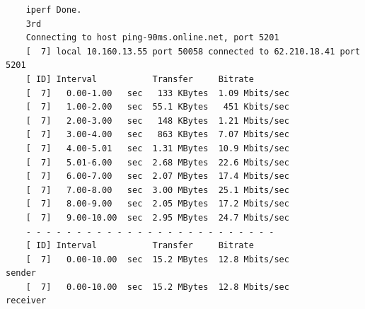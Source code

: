 \documentclass[paper=a4, fontsize=10pt]{scrartcl} %
\numberwithin{equation}{section} %
\numberwithin{figure}{section} %
\numberwithin{table}{section} %
\begin{document}
\begin{lstlisting}
    iperf Done.
    3rd
    Connecting to host ping-90ms.online.net, port 5201
    [  7] local 10.160.13.55 port 50058 connected to 62.210.18.41 port 5201
    [ ID] Interval           Transfer     Bitrate
    [  7]   0.00-1.00   sec   133 KBytes  1.09 Mbits/sec                  
    [  7]   1.00-2.00   sec  55.1 KBytes   451 Kbits/sec                  
    [  7]   2.00-3.00   sec   148 KBytes  1.21 Mbits/sec                  
    [  7]   3.00-4.00   sec   863 KBytes  7.07 Mbits/sec                  
    [  7]   4.00-5.01   sec  1.31 MBytes  10.9 Mbits/sec                  
    [  7]   5.01-6.00   sec  2.68 MBytes  22.6 Mbits/sec                  
    [  7]   6.00-7.00   sec  2.07 MBytes  17.4 Mbits/sec                  
    [  7]   7.00-8.00   sec  3.00 MBytes  25.1 Mbits/sec                  
    [  7]   8.00-9.00   sec  2.05 MBytes  17.2 Mbits/sec                  
    [  7]   9.00-10.00  sec  2.95 MBytes  24.7 Mbits/sec                  
    - - - - - - - - - - - - - - - - - - - - - - - - -
    [ ID] Interval           Transfer     Bitrate
    [  7]   0.00-10.00  sec  15.2 MBytes  12.8 Mbits/sec                  sender
    [  7]   0.00-10.00  sec  15.2 MBytes  12.8 Mbits/sec                  receiver
    

\end{lstlisting}
\end{document}
